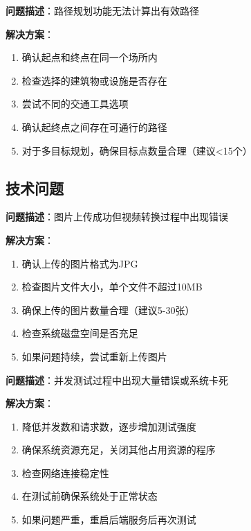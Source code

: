\documentclass[12pt, a4paper]{article}
\begin{document}
\begin{successbox}[title={Q4: 路径规划失败}]
\textbf{问题描述}：路径规划功能无法计算出有效路径

\textbf{解决方案}：
\begin{enumerate}[nosep]
    \item 确认起点和终点在同一个场所内
    \item 检查选择的建筑物或设施是否存在
    \item 尝试不同的交通工具选项
    \item 确认起终点之间存在可通行的路径
    \item 对于多目标规划，确保目标点数量合理（建议<15个）
\end{enumerate}
\end{successbox}

\subsection{技术问题}

\begin{warningbox}[title={Q5: AIGC视频转换失败}]
\textbf{问题描述}：图片上传成功但视频转换过程中出现错误

\textbf{解决方案}：
\begin{enumerate}[nosep]
    \item 确认上传的图片格式为JPG
    \item 检查图片文件大小，单个文件不超过10MB
    \item 确保上传的图片数量合理（建议5-30张）
    \item 检查系统磁盘空间是否充足
    \item 如果问题持续，尝试重新上传图片
\end{enumerate}
\end{warningbox}

\begin{warningbox}[title={Q6: 并发测试异常}]
\textbf{问题描述}：并发测试过程中出现大量错误或系统卡死

\textbf{解决方案}：
\begin{enumerate}[nosep]
    \item 降低并发数和请求数，逐步增加测试强度
    \item 确保系统资源充足，关闭其他占用资源的程序
    \item 检查网络连接稳定性
    \item 在测试前确保系统处于正常状态
    \item 如果问题严重，重启后端服务后再次测试
\end{enumerate}
\end{warningbox}
\end{document}
